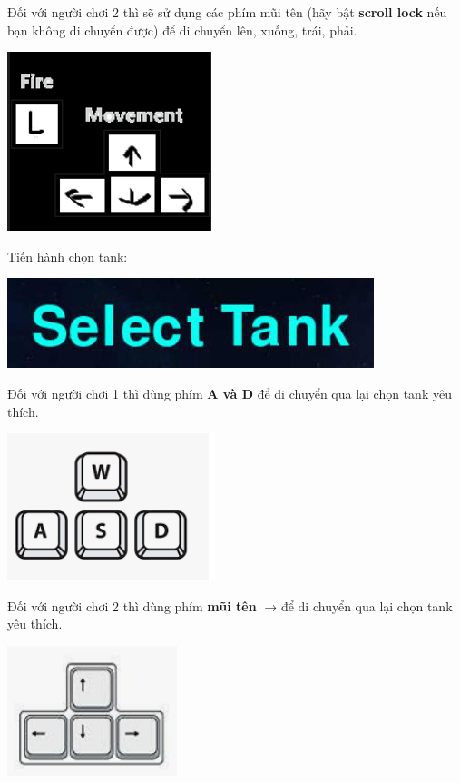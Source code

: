 \documentclass[a4paper]{article}
\begin{document}
Đối với người chơi 2 thì sẽ sử dụng các phím mũi tên (hãy bật
\textbf{scroll lock} nếu bạn không di chuyển được) để di chuyển lên,
xuống, trái, phải.

\includegraphics[width=2.34306in,height=2.05278in]{image19.png}

Tiến hành chọn tank:

\includegraphics[width=4.20694in,height=1.03194in]{image20.png}

Đối với người chơi 1 thì dùng phím \textbf{A và D} để di chuyển qua lại
chọn tank yêu thích.

\includegraphics[width=2.38333in,height=1.6875in]{image21.png}

Đối với người chơi 2 thì dùng phím \textbf{mũi tên} → để di chuyển qua lại chọn tank yêu thích.

\includegraphics[width=1.94583in,height=1.48889in]{image22.png}
\end{document}
